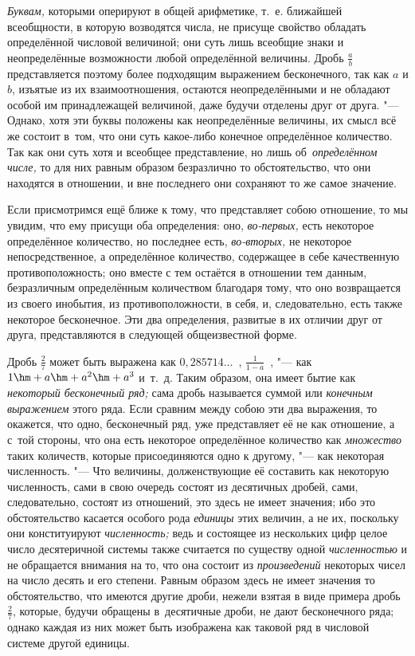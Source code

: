 {\em Буквам,} которыми оперируют в общей арифметике, т.~е. ближайшей
всеобщности, в которую возводятся числа, не присуще свойство обладать
определённой числовой величиной; они суть лишь всеобщие знаки и неопределённые
возможности любой определённой величины. Дробь $\frac a b$ представляется
поэтому более подходящим выражением бесконечного, так как $a$ и $b$,
изъятые из их взаимоотношения, остаются неопределёнными и не обладают особой им
принадлежащей величиной, даже будучи отделены друг от друга. "--- Однако, хотя
эти буквы положены как неопределённые величины, их смысл всё же состоит в~том,
что они суть какое-либо конечное определённое количество. Так как они суть хотя
и всеобщее представление, но лишь об~{\em определённом числе,} то для них
равным образом безразлично то обстоятельство, что они находятся в отношении,
и вне последнего они сохраняют то же самое значение.

Если присмотримся ещё ближе к тому, что представляет собою отношение, то мы
увидим, что ему присущи оба определения: оно, {\em во-первых,} есть некоторое
определённое количество, но последнее есть, {\em во-вторых,} не некоторое
непосредственное, а определённое количество, содержащее в себе качественную
противоположность; оно вместе с тем остаётся в отношении тем данным,
безразличным определённым количеством благодаря тому, что оно возвращается из
своего инобытия, из противоположности, в себя, и, следовательно, есть также
некоторое бесконечное. Эти два определения, развитые в их отличии друг от
друга, представляются в следующей общеизвестной форме.

Дробь $\frac 2 7$ может быть выражена как $0{,}285714\ldots$~,
$\frac 1{1-a}$~, "--- как $1\hm+a\hm+a^2\hm+a^3$ и~т.~д. Таким образом, она
имеет бытие как {\em некоторый бесконечный ряд;} сама дробь называется суммой
или {\em конечным выражением} этого ряда. Если сравним между собою эти два
выражения, то окажется, что одно, бесконечный ряд, уже представляет её не как
отношение, а с~той стороны, что она есть некоторое определённое количество как
{\em множество} таких количеств, которые присоединяются одно к другому, "---
как некоторая численность. "--- Что величины, долженствующие её составить как
некоторую численность, сами в свою очередь состоят из десятичных дробей, сами,
следовательно, состоят из отношений, это здесь не имеет значения; ибо это
обстоятельство касается особого рода {\em единицы} этих величин, а не их,
поскольку они конституируют {\em численность;} ведь и состоящее из нескольких
цифр целое число десятеричной системы также считается по существу одной
{\em численностью} и не обращается внимания на то, что она состоит из
{\em произведений} некоторых чисел на число десять и его степени. Равным
образом здесь не имеет значения то обстоятельство, что имеются другие дроби,
нежели взятая в виде примера дробь $\frac 2 7$, которые, будучи обращены
в~десятичные дроби, не дают бесконечного ряда; однако каждая из них может быть
изображена как таковой ряд в числовой системе другой единицы.

